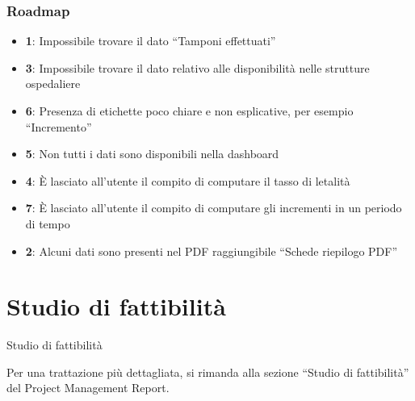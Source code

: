 \documentclass[handout]{beamer}
\begin{document}
			\begin{frame}
				\frametitle{Roadmap}
				\begin{itemize}[<+->]
					\item<1-> \textbf{1}: Impossibile trovare il dato ``Tamponi effettuati''\\
					\item<2-> \textbf{3}: Impossibile trovare il dato relativo alle disponibilità nelle strutture ospedaliere\\
					\item<3-> \textbf{6}: Presenza di etichette poco chiare e non esplicative, per esempio ``Incremento''\\
					\item<4-> \textbf{5}: Non tutti i dati sono disponibili nella dashboard
					\item<5-> \textbf{4}: \`E lasciato all'utente il compito di computare il tasso di letalità\\
					\item<6-> \textbf{7}: \`E lasciato all'utente il compito di computare gli incrementi in un periodo di tempo\\
					\item<7-> \textbf{2}: Alcuni dati sono presenti nel PDF raggiungibile ``Schede riepilogo PDF''\\
				\end{itemize}
			\end{frame}

	\section{Studio di fattibilità}
		\begin{frame}
			\centering
			\begin{Huge}
				Studio di fattibilità
			\end{Huge}
			\mbox{}
			\vfill
			\vspace*{100px}
			\begin{tiny}
				Per una trattazione più dettagliata, si rimanda alla sezione ``Studio di fattibilità'' del Project Management Report.
			\end{tiny}
		\end{frame}
\end{document}
